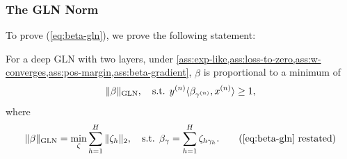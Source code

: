 \documentclass{article}
\theoremstyle{plain}
\theoremstyle{definition}
\theoremstyle{remark}
\begin{document}
\subsubsection{The GLN Norm}
\label{app:special-case-norm}

To prove (\ref{eq:beta-gln}), we prove the following statement:

\begin{proposition}
For a deep GLN with two layers, under \cref{ass:exp-like,ass:loss-to-zero,ass:w-converges,ass:pos-margin,ass:beta-gradient}, $\hat{\beta}$ is proportional to a minimum of
\begin{equation}
    \|\beta\|_{\rm GLN},\quad
    \text{s.t. }y^{(n)}\langle\beta_{\gamma^{(n)}},x^{(n)}\rangle\geq1,
\end{equation}
where
\begin{equation}
    \|\beta\|_{\rm GLN}=\min_{\zeta}\sum_{h=1}^H\|\zeta_h\|_2,\quad
    \text{s.t. }\beta_{\gamma}=\sum_{h=1}^H\zeta_{h\gamma_h}.
    \tag{\ref{eq:beta-gln} restated}
\end{equation}
\end{proposition}
\end{document}
